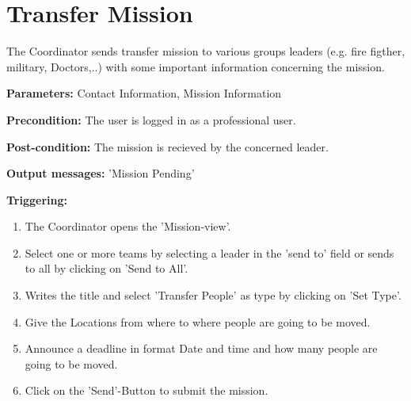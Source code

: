 \section{Transfer Mission}
\label{operation:TransferMission}
The Coordinator sends transfer mission to various groups leaders (e.g. fire
figther, military, Doctors,..) with some important information concerning the
mission.\\
\begin{description}
\item \textbf{Parameters:} Contact Information, Mission Information
\item \textbf{Precondition:} The user is logged in as a professional user.
\item \textbf{Post-condition:} The mission is recieved by the concerned leader.
\item \textbf{Output messages:} 'Mission Pending'
\item \textbf{Triggering:}
\begin{enumerate}
\item The Coordinator opens the 'Mission-view'.
\item Select one or more teams by selecting a leader in the 'send to' field or
sends to all by clicking on 'Send to All'.
\item Writes the title and select 'Transfer People' as type by clicking on 'Set
Type'.
\item Give the Locations from where to where people are going to be moved.
\item Announce a deadline in format Date and time and how many people are going
to be moved.
\item Click on the 'Send'-Button to submit the mission.
\end{enumerate}
\end{description}

